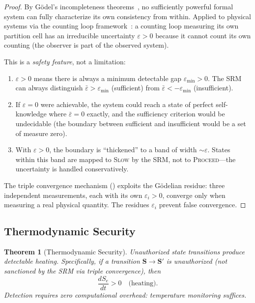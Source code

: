 \documentclass[twocolumn,10pt]{article}
\newtheorem{theorem}{Theorem}[section]
\theoremstyle{definition}
\newcommand{\Sentropy}{\mathbf{S}}
\newcommand{\Se}{S_e}
\begin{document}
\begin{proof}
By G\"{o}del's incompleteness theorems~\cite{godel1931}, no sufficiently powerful formal system can fully characterize its own consistency from within. Applied to physical systems via the counting loop framework~\cite{sachikonye2026trajectory}: a counting loop measuring its own partition cell has an irreducible uncertainty $\varepsilon > 0$ because it cannot count its own counting (the observer is part of the observed system).

This is a \emph{safety feature}, not a limitation:
\begin{enumerate}
\item $\varepsilon > 0$ means there is always a minimum detectable gap $\varepsilon_{\min} > 0$. The SRM can always distinguish $\bar{\varepsilon} > \varepsilon_{\min}$ (sufficient) from $\bar{\varepsilon} < -\varepsilon_{\min}$ (insufficient).
\item If $\varepsilon = 0$ were achievable, the system could reach a state of perfect self-knowledge where $\bar{\varepsilon} = 0$ exactly, and the sufficiency criterion would be undecidable (the boundary between sufficient and insufficient would be a set of measure zero).
\item With $\varepsilon > 0$, the boundary is ``thickened'' to a band of width $\sim \varepsilon$. States within this band are mapped to \textsc{Slow} by the SRM, not to \textsc{Proceed}---the uncertainty is handled conservatively.
\end{enumerate}
The triple convergence mechanism () exploits the G\"{o}delian residue: three independent measurements, each with its own $\varepsilon_i > 0$, converge only when measuring a real physical quantity. The residues $\varepsilon_i$ prevent false convergence.
\end{proof}

\subsection{Thermodynamic Security}

\begin{theorem}[Thermodynamic Security]
\label{thm:thermo-security}
Unauthorized state transitions produce detectable heating. Specifically, if a transition $\Sentropy \to \Sentropy'$ is unauthorized (not sanctioned by the SRM via triple convergence), then
\begin{equation}
\frac{d\Se}{dt} > 0 \quad \text{(heating)}.
\end{equation}
Detection requires zero computational overhead: temperature monitoring suffices.
\end{theorem}
\end{document}
